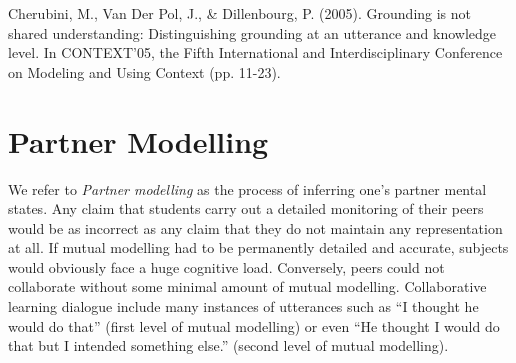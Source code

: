 \documentclass[natbib]{svjour3}
\begin{document}
Cherubini, M., Van Der Pol, J., \& Dillenbourg, P. (2005). Grounding is not
shared understanding: Distinguishing grounding at an utterance and knowledge
level. In CONTEXT'05, the Fifth International and Interdisciplinary Conference
on Modeling and Using Context (pp. 11-23).


 







\section{Partner Modelling}

We refer to \emph{Partner modelling} as the process of inferring one's partner
mental states. Any claim that students carry out a detailed monitoring of their
peers would be as incorrect as any claim that they do not maintain any
representation at all. If mutual modelling had to be permanently detailed and
accurate, subjects would obviously face a huge cognitive load. Conversely, peers
could not collaborate without some minimal amount of mutual modelling.
Collaborative learning dialogue include many instances of utterances such as ``I
thought he would do that'' (first level of mutual modelling) or even ``He
thought I would do that but I intended something else.'' (second level of mutual
modelling).

\end{document}
